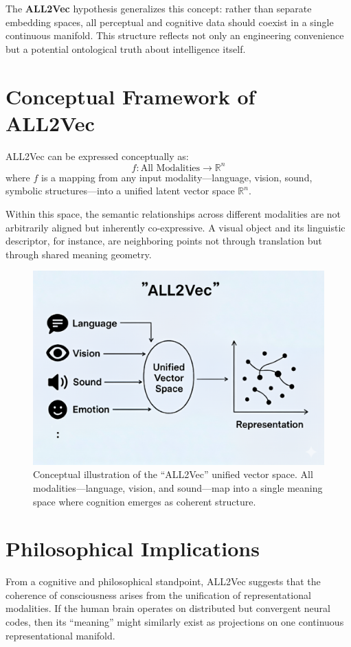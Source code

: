 \documentclass[11pt]{article}
\begin{document}
The \textbf{ALL2Vec} hypothesis generalizes this concept: rather than separate embedding spaces, all perceptual and cognitive data should coexist in a single continuous manifold. This structure reflects not only an engineering convenience but a potential ontological truth about intelligence itself.

\section{Conceptual Framework of ALL2Vec}
ALL2Vec can be expressed conceptually as:
\[
f : \text{All Modalities} \rightarrow \mathbb{R}^n
\]
where $f$ is a mapping from any input modality—language, vision, sound, symbolic structures—into a unified latent vector space $\mathbb{R}^n$.

Within this space, the semantic relationships across different modalities are not arbitrarily aligned but inherently co-expressive. A visual object and its linguistic descriptor, for instance, are neighboring points not through translation but through shared meaning geometry.

\begin{figure}[h!]
    \centering
    \includegraphics[width=0.85\linewidth]{ALL2Vec_diagram.png}
    \caption{Conceptual illustration of the ``ALL2Vec'' unified vector space. All modalities—language, vision, and sound—map into a single meaning space where cognition emerges as coherent structure.}
\end{figure}

\section{Philosophical Implications}
From a cognitive and philosophical standpoint, ALL2Vec suggests that the coherence of consciousness arises from the unification of representational modalities. If the human brain operates on distributed but convergent neural codes, then its “meaning” might similarly exist as projections on one continuous representational manifold.
\end{document}
